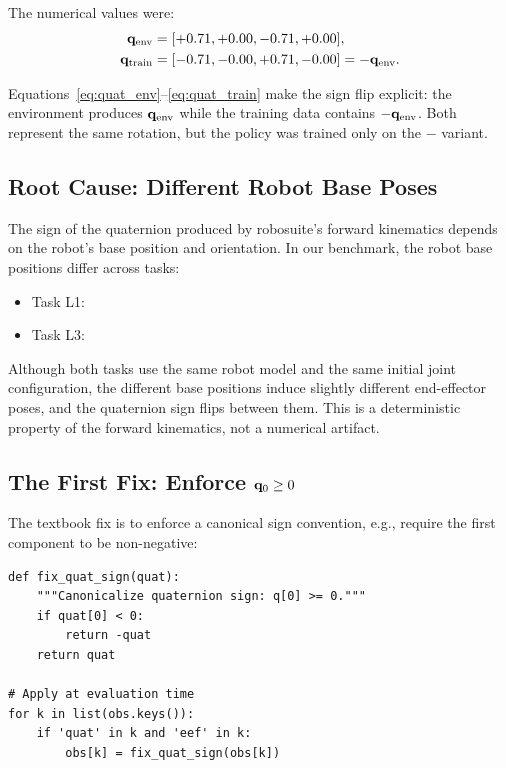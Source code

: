 The numerical values were:
\begin{align}
\mathbf{q}_{\text{env}}    &= [+0.71, +0.00, -0.71, +0.00], \label{eq:quat_env} \\
\mathbf{q}_{\text{train}}  &= [-0.71, -0.00, +0.71, -0.00] = -\mathbf{q}_{\text{env}}. \label{eq:quat_train}
\end{align}

Equations~\eqref{eq:quat_env}--\eqref{eq:quat_train} make the sign flip explicit: the environment produces $\mathbf{q}_{\text{env}}$ while the training data contains $-\mathbf{q}_{\text{env}}$. Both represent the same rotation, but the policy was trained only on the $-$ variant.

\subsection{Root Cause: Different Robot Base Poses}
\label{sec:quaternion:root_cause}

The sign of the quaternion produced by robosuite's forward kinematics depends on the robot's base position and orientation. In our benchmark, the robot base positions differ across tasks:

\begin{itemize}[leftmargin=*,itemsep=2pt]
    \item Task L1: 
    \item Task L3: 
\end{itemize}

Although both tasks use the same robot model and the same initial joint configuration, the different base positions induce slightly different end-effector poses, and the quaternion sign flips between them. This is a deterministic property of the forward kinematics, not a numerical artifact.

\subsection{The First Fix: Enforce $\mathbf{q}_0 \geq 0$}
\label{sec:quaternion:first_fix}

The textbook fix is to enforce a canonical sign convention, e.g., require the first component to be non-negative:

\begin{lstlisting}[caption={Sign canonicalization: enforce $\quat_0 \geq 0$.}]
def fix_quat_sign(quat):
    """Canonicalize quaternion sign: q[0] >= 0."""
    if quat[0] < 0:
        return -quat
    return quat

# Apply at evaluation time
for k in list(obs.keys()):
    if 'quat' in k and 'eef' in k:
        obs[k] = fix_quat_sign(obs[k])
\end{lstlisting}

